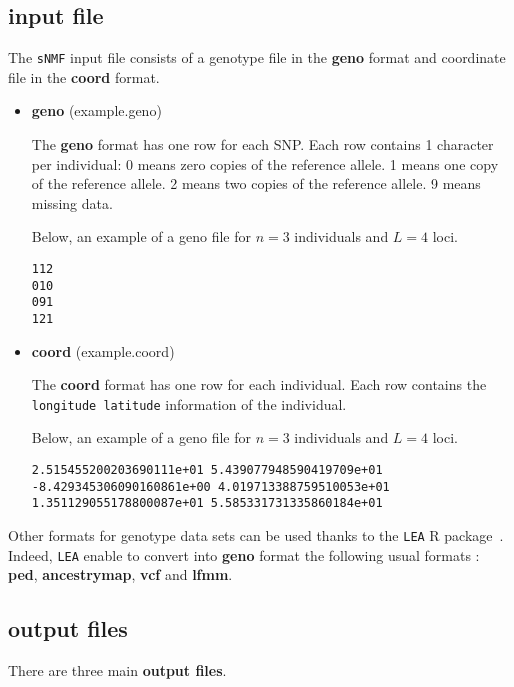 \documentclass[10pt,a4paper]{article}
\begin{document}
\subsection{input file}
The {\tt sNMF} input file consists of a genotype file in the {\bf geno} format and coordinate file in the {\bf coord} format. 
\begin{itemize}
\item {\bf geno} (example.geno)

The {\bf geno} format has one row for each SNP.
  Each row contains 1 character per individual:
  0 means zero copies of the reference allele.
  1 means one copy of the reference allele.
  2 means two copies of the reference allele.
  9 means missing data.

Below, an example of a geno file for $n=3$ individuals and $L=4$ loci.
\begin{center}
\footnotesize
\begin{Verbatim}[frame=single]
112
010
091
121
\end{Verbatim}
\end{center}


\item {\bf coord} (example.coord)

The {\bf coord} format has one row for each individual. Each row contains the \verb|longitude latitude| information of the individual.

Below, an example of a geno file for $n=3$ individuals and $L=4$ loci.
\begin{center}
\footnotesize
\begin{Verbatim}[frame=single]
2.515455200203690111e+01 5.439077948590419709e+01
-8.429345306090160861e+00 4.019713388759510053e+01
1.351129055178800087e+01 5.585331731335860184e+01
\end{Verbatim}
\end{center}

\end{itemize}

\noindent
Other formats for genotype data sets can be used thanks to the {\tt LEA} R package~\cite{frichot2015lea}. Indeed, {\tt LEA} enable to convert into {\bf geno} format the following usual formats : {\bf ped}, {\bf ancestrymap}, {\bf vcf} and {\bf lfmm}.

\subsection{output files}
\noindent
There are three main {\bf output files}.
\end{document}
